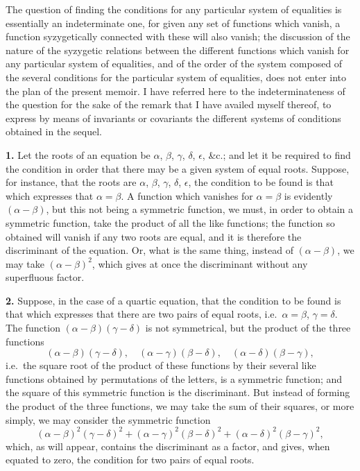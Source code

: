 \documentclass[11pt,a4paper]{article}
\begin{document}
The question of finding the conditions for any particular system of equalities
is essentially an indeterminate one, for given any set of functions which
vanish, a function syzygetically connected with these will also vanish; the
discussion of the nature of the syzygetic relations between the different
functions which vanish for any particular system of equalities, and of the
order of the system composed of the several conditions for the particular
system of equalities, does not enter into the plan of the present memoir.
I have referred here to the indeterminateness of the question for the sake of
the remark that I have availed myself thereof, to express by means of
invariants or covariants the different systems of conditions obtained in the
sequel.

\textbf{1.} Let the roots of an equation be $\alpha$, $\beta$, $\gamma$,
$\delta$, $\epsilon$, \&c.; and let it be required to find the condition in
order that there may be a given system of equal roots. Suppose, for instance,
that the roots are $\alpha$, $\beta$, $\gamma$, $\delta$, $\epsilon$, the
condition to be found is that which expresses that $\alpha = \beta$. A
function which vanishes for $\alpha = \beta$ is evidently
$(\alpha - \beta)$, but this not being a symmetric function, we must, in
order to obtain a symmetric function, take the product of all the like
functions; the function so obtained will vanish if any two roots are equal,
and it is therefore the discriminant of the equation. Or, what is the same
thing, instead of $(\alpha - \beta)$, we may take $(\alpha - \beta)^2$,
which gives at once the discriminant without any superfluous factor.

\textbf{2.} Suppose, in the case of a quartic equation, that the condition to
be found is that which expresses that there are two pairs of equal roots,
i.e.\ $\alpha = \beta$, $\gamma = \delta$. The function
$(\alpha - \beta)(\gamma - \delta)$ is not symmetrical, but the product of
the three functions
\[
(\alpha - \beta)(\gamma - \delta), \quad
(\alpha - \gamma)(\beta - \delta), \quad
(\alpha - \delta)(\beta - \gamma),
\]
i.e.\ the square root of the product of these functions by their several
like functions obtained by permutations of the letters, is a symmetric
function; and the square of this symmetric function is the discriminant. But
instead of forming the product of the three functions, we may take the sum of
their squares, or more simply, we may consider the symmetric function
\[
(\alpha - \beta)^2 (\gamma - \delta)^2
+ (\alpha - \gamma)^2 (\beta - \delta)^2
+ (\alpha - \delta)^2 (\beta - \gamma)^2,
\]
which, as will appear, contains the discriminant as a factor, and gives, when
equated to zero, the condition for two pairs of equal roots.
\end{document}
